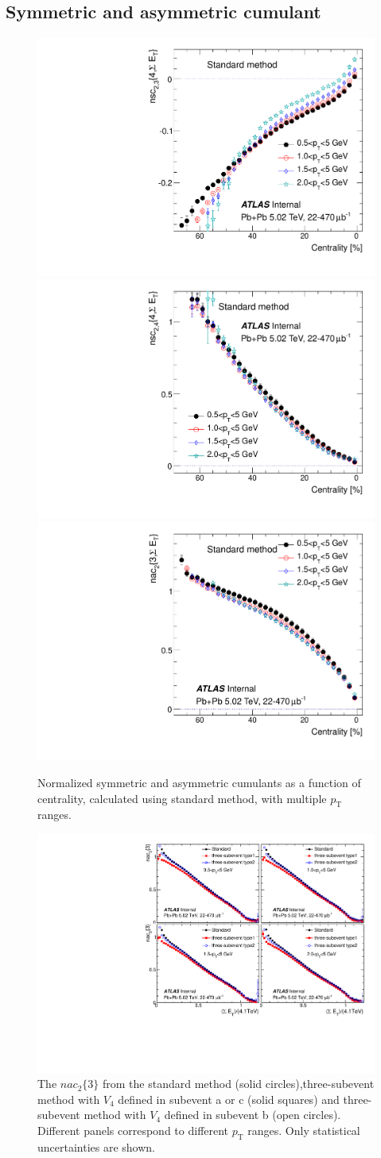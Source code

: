 \subsection{Symmetric and asymmetric cumulant}

\begin{figure}[H]
\centering
\includegraphics[width=.32\linewidth]{figs/sec_paper/comp_nsc_har2_Cent.pdf}
\includegraphics[width=.32\linewidth]{figs/sec_paper/comp_nsc_har3_Cent.pdf}
\includegraphics[width=.32\linewidth]{figs/sec_paper/comp_nac_har2_Cent.pdf}
\caption{Normalized symmetric and asymmetric cumulants as a function of centrality, calculated using standard method, with multiple $p_\text{T}$ ranges.}
\label{fig:paper_nsc}
\end{figure}

\begin{figure}[H]
\centering
\includegraphics[width=.6\linewidth]{figs/sec_paper/nac_decorr1.pdf}
\caption{The $nac_2\{3\}$ from the standard method (solid circles),three-subevent method with $V_4$ defined in subevent a or c (solid squares) and three-subevent method with $V_4$ defined in subevent b (open circles). Different panels correspond to different $p_\text{T}$ ranges. Only statistical uncertainties are shown.}
\label{fig:paper_nac_decorr1}
\end{figure}

